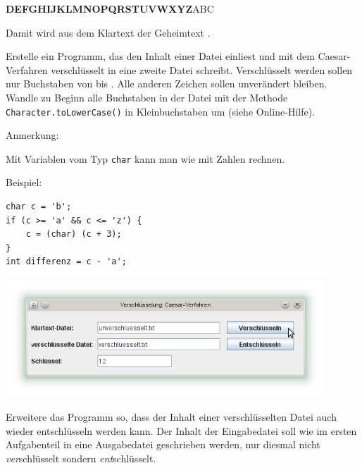 \textbf{DEFGHIJKLMNOPQRSTUVWXYZ}ABC

Damit wird aus dem Klartext  der Geheimtext
.

\begin{compactenum}[a)]
\item Erstelle ein Programm, das den Inhalt einer Datei einliest und mit dem
Caesar-Verfahren verschlüsselt in eine zweite Datei schreibt. Verschlüsselt
werden sollen nur Buchstaben von  bis . Alle
anderen Zeichen sollen unverändert bleiben. Wandle zu Beginn alle Buchstaben in
der Datei mit der Methode \lstinline|Character.toLowerCase()| in
Kleinbuchstaben um (siehe Online-Hilfe).

\begin{minipage}{0.35\textwidth}
Anmerkung:

Mit Variablen vom Typ \lstinline|char| kann man wie mit Zahlen rechnen.

Beispiel:

\begin{lstlisting}
char c = 'b';
if (c >= 'a' && c <= 'z') {
    c = (char) (c + 3);
}
int differenz = c - 'a';
\end{lstlisting}

\end{minipage}
\begin{minipage}{0.65\textwidth}
\begin{center}
\includegraphics[width=0.9\textwidth]{./inf/SEKII/27_Java_Dateizugriffe/Verschluesselung.png}
\end{center}
\end{minipage}

\item Erweitere das Programm so, dass der Inhalt einer verschlüsselten Datei
auch wieder entschlüsseln werden kann. Der Inhalt der Eingabedatei soll wie im
ersten Aufgabenteil in eine Ausgabedatei geschrieben werden, nur diesmal nicht
\emph{ver}schlüsselt sondern \emph{ent}schlüsselt.
\end{compactenum}



